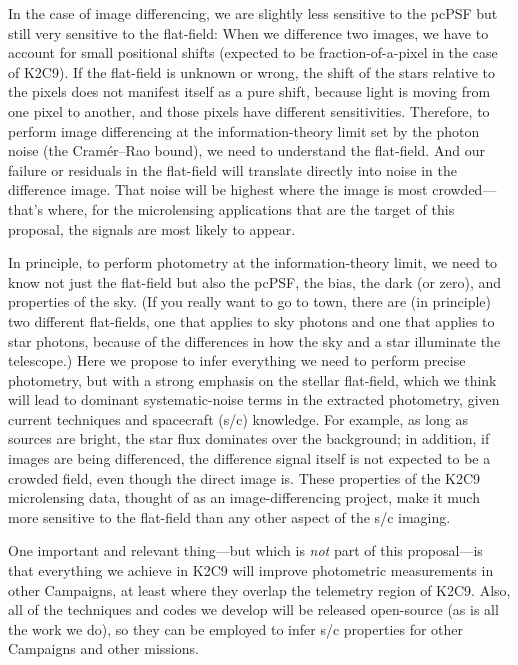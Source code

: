 \documentclass[12pt,preprint]{aastex}
\begin{document}
In the case of image differencing, we are slightly less sensitive to the
pcPSF but still very sensitive to the flat-field:
When we difference two images, we have to account for small positional
shifts (expected to be fraction-of-a-pixel in the case of K2C9).
If the flat-field is unknown or wrong, the shift of the stars relative
to the pixels does not manifest itself as a pure shift, because light
is moving from one pixel to another, and those pixels have different
sensitivities.
Therefore, to perform image differencing at the information-theory
limit set by the photon noise (the Cram\'er--Rao bound), we need to
understand the flat-field.
And our failure or residuals in the flat-field will translate directly
into noise in the difference image.
That noise will be highest where the image is most crowded---that's where, for
the microlensing applications that are the target of this proposal,
the signals are most likely to appear.

In principle, to perform photometry at the information-theory limit,
we need to know not just the flat-field but also the pcPSF, the bias,
the dark (or zero), and properties of the sky.
(If you really want to go to town, there are (in principle) two different
flat-fields, one that applies to sky photons and one that applies to star photons,
because of the differences in how the sky and a star illuminate the telescope.)
Here we propose to infer everything we need to perform precise
photometry, but with a strong emphasis on the stellar flat-field, which we
think will lead to dominant systematic-noise terms in the extracted
photometry, given current techniques and spacecraft (s/c) knowledge.
For example, as long as sources are bright, the star flux dominates
over the background; in addition, if images are being differenced, the
difference signal itself is not expected to be a crowded field, even though
the direct image is.
These properties of the K2C9 microlensing data, thought of as an
image-differencing project, make it much more sensitive to the flat-field than
any other aspect of the s/c imaging.

One important and relevant thing---but which is \emph{not} part of this
proposal---is that everything we achieve in K2C9 will improve photometric
measurements in other Campaigns, at least where they overlap the
telemetry region of K2C9.
Also, all of the techniques and codes we develop will be released
open-source (as is all the work we do), so they can be employed to
infer s/c properties for other Campaigns and other missions.
\end{document}
